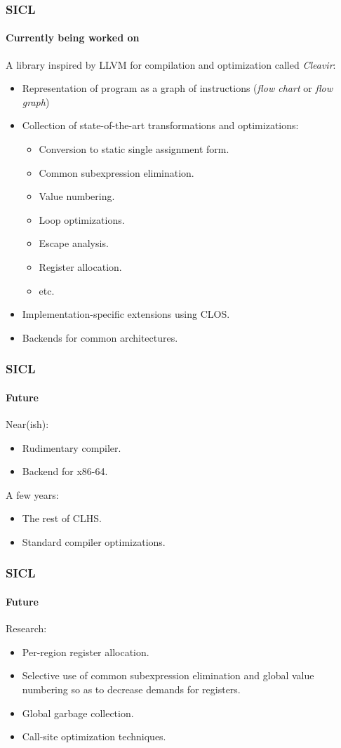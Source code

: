\documentclass[12pt]{beamer}
\begin{document}
\begin{frame}
  \frametitle{SICL}
  \framesubtitle{Currently being worked on}

A library inspired by LLVM for compilation and optimization called
\emph{Cleavir}: 

\begin{itemize}
\item Representation of program as a graph of instructions (\emph{flow
  chart} or \emph{flow graph})
\item Collection of state-of-the-art transformations and
  optimizations:
  \begin{itemize}
  \item Conversion to static single assignment form.
  \item Common subexpression elimination.
  \item Value numbering.
  \item Loop optimizations.
  \item Escape analysis.
  \item Register allocation.
  \item etc.
  \end{itemize}
\item Implementation-specific extensions using CLOS.
\item Backends for common architectures.
\end{itemize}

\end{frame}
\begin{frame}
  \frametitle{SICL}
  \framesubtitle{Future}

Near(ish):
\begin{itemize}
\item Rudimentary compiler.
\item Backend for x86-64.
\end{itemize}
\vskip 0.5cm
  
A few years:
\begin{itemize}
\item The rest of CLHS.
\item Standard compiler optimizations.
\end{itemize}

\end{frame}
\begin{frame}
  \frametitle{SICL}
  \framesubtitle{Future}

Research:

\begin{itemize}
\item Per-region register allocation.
\item Selective use of common subexpression elimination and global
  value numbering so as to decrease demands for registers.
\item Global garbage collection.
\item Call-site optimization techniques. 
\end{itemize}

\end{frame}
\end{document}
